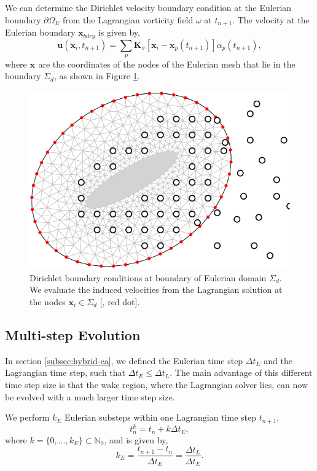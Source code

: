 We can determine the Dirichlet velocity boundary condition at the Eulerian boundary $\partial \Omega_E$ from the Lagrangian vorticity field $\omega$ at $t_{n+1}$. The velocity at the Eulerian boundary $\mathbf{x}_{bdry}$ is given by,
\begin{equation}
\mathbf{u}(\mathbf{x}_{i},t_{n+1}) = \sum_p \mathbf{K}_{\sigma}[\mathbf{x}_{i} - \mathbf{x}_p(t_{n+1})]\alpha_p(t_{n+1}),
\end{equation}
where $\mathbf{x}_{}$ are the coordinates of the nodes of the Eulerian mesh that lie in the boundary $\Sigma_d$, as shown in Figure \ref{fig:eulerianDirichletBC2}.

	\begin{figure}[!h]
	\centering
	\includegraphics[width=0.5\linewidth]{./figures/hybrid/dirichlet/eulerianDirichletBC-crop.pdf}
	\caption{Dirichlet boundary conditions at boundary of Eulerian domain $\Sigma_d$. We evaluate the induced velocities from the Lagrangian solution at the nodes $\mathbf{x}_i\in\Sigma_d$ [{\color{plotRed}{$\bullet$}}, red dot].}
	\label{fig:eulerianDirichletBC2}
	\end{figure}	


\subsection{Multi-step Evolution}
\label{subsec:mse2}
In section \ref{subsec:hybrid-ca}, we defined the Eulerian time step $\Delta t_E$ and the Lagrangian time step, such that $\Delta t_E \leqslant \Delta t_L$. The main advantage of this different time step size is that the wake region, where the Lagrangian solver lies, can now be evolved with a much larger time step size.

We perform $k_E$ Eulerian substeps within one Lagrangian time step $t_{n+1}$,
\begin{equation}
t_n^k = t_n + k\Delta t_E,
\end{equation}
where $k = \{0,...,k_E\} \subset \mathbb{N}_0$, and is given by,
\begin{equation}
k_E = \frac{t_{n+1}-t_{n}}{\Delta t_E} = \frac{\Delta t_L}{\Delta t_E}.
\label{eq:timeStepDependency2}
\end{equation}

